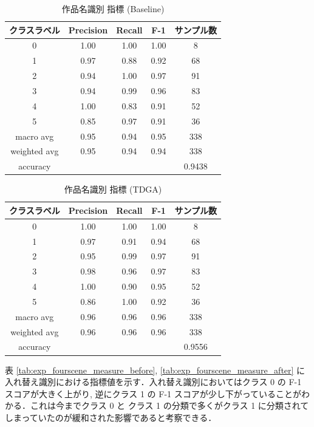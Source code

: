 \documentclass[onecolumn]{ujarticle}   %
\begin{document}
  \begin{table}[h]
  	\centering
  	\caption{作品名識別 指標 (Baseline)}
  	\vspace{-3mm}
  	\label{tab:exp_title_measure_before}
  	\begin{tabular}{|c|c|c|c|c|} \hline
  		クラスラベル&Precision&Recall&F-1&サンプル数\\ \hline\hline
  		0&1.00&1.00&1.00&8\\ \hline
  		1&0.97&0.88&0.92&68\\ \hline
  		2&0.94&1.00&0.97&91\\ \hline
  		3&0.94&0.99&0.96&83\\ \hline
  		4&1.00&0.83&0.91&52\\ \hline
      5&0.85&0.97&0.91&36\\ \hline
  		macro avg&0.95&0.94&0.95&338\\ \hline
  		weighted avg&0.95&0.94&0.94&338\\ \hline
  		accuracy&&&&0.9438\\ \hline
  	\end{tabular}
  \end{table}

  \begin{table}[h]
  	\centering
  	\caption{作品名識別 指標 (TDGA)}
  	\vspace{-3mm}
  	\label{tab:exp_title_measure_after}
  	\begin{tabular}{|c|c|c|c|c|} \hline
  		クラスラベル&Precision&Recall&F-1&サンプル数\\ \hline\hline
  		0&1.00&1.00&1.00&8\\ \hline
  		1&0.97&0.91&0.94&68\\ \hline
  		2&0.95&0.99&0.97&91\\ \hline
  		3&0.98&0.96&0.97&83\\ \hline
  		4&1.00&0.90&0.95&52\\ \hline
      5&0.86&1.00&0.92&36\\ \hline
  		macro avg&0.96&0.96&0.96&338\\ \hline
  		weighted avg&0.96&0.96&0.96&338\\ \hline
  		accuracy&&&&0.9556\\ \hline
  	\end{tabular}
  \end{table}

  表 \ref{tab:exp_fourscene_measure_before}, \ref{tab:exp_fourscene_measure_after} に入れ替え識別における指標値を示す．入れ替え識別においてはクラス 0 の F-1 スコアが大きく上がり, 逆にクラス 1 の F-1 スコアが少し下がっていることがわかる．これは今までクラス 0 と クラス 1 の分類で多くがクラス 1 に分類されてしまっていたのが緩和された影響であると考察できる．
\end{document}
